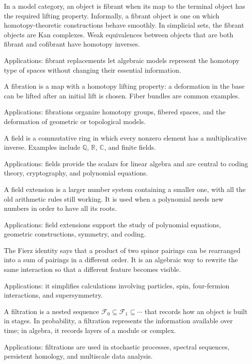 In a model category, an object is fibrant when its map to the terminal object has the required lifting property. Informally, a fibrant object is one on which homotopy-theoretic constructions behave smoothly. In simplicial sets, the fibrant objects are Kan complexes. Weak equivalences between objects that are both fibrant and cofibrant have homotopy inverses. \par\noindent Applications: fibrant replacements let algebraic models represent the homotopy type of spaces without changing their essential information.

A fibration is a map with a homotopy lifting property: a deformation in the base can be lifted after an initial lift is chosen. Fiber bundles are common examples. \par\noindent Applications: fibrations organize homotopy groups, fibered spaces, and the deformation of geometric or topological models.

A field is a commutative ring in which every nonzero element has a multiplicative inverse. Examples include $\mathbb Q$, $\mathbb R$, $\mathbb C$, and finite fields. \par\noindent Applications: fields provide the scalars for linear algebra and are central to coding theory, cryptography, and polynomial equations.

A field extension is a larger number system containing a smaller one, with all the old arithmetic rules still working. It is used when a polynomial needs new numbers in order to have all its roots. \par\noindent Applications: field extensions support the study of polynomial equations, geometric constructions, symmetry, and coding.

The Fierz identity says that a product of two spinor pairings can be rearranged into a sum of pairings in a different order. It is an algebraic way to rewrite the same interaction so that a different feature becomes visible. \par\noindent Applications: it simplifies calculations involving particles, spin, four-fermion interactions, and supersymmetry.

A filtration is a nested sequence $\mathcal F_0\subseteq\mathcal F_1\subseteq\cdots$ that records how an object is built in stages. In probability, a filtration represents the information available over time; in algebra, it records layers of a module or complex. \par\noindent Applications: filtrations are used in stochastic processes, spectral sequences, persistent homology, and multiscale data analysis.

